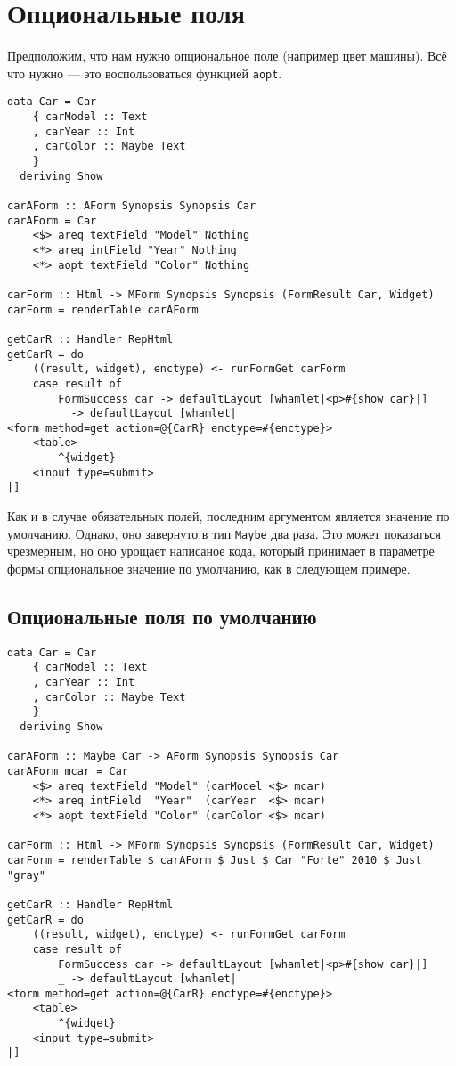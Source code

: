 \section{Опциональные поля}
Предположим, что нам нужно опциональное поле (например цвет машины). Всё что нужно ---
это воспользоваться функцией \lstinline'aopt'.
\begin{remark}
\begin{lstlisting}
data Car = Car
    { carModel :: Text
    , carYear :: Int
    , carColor :: Maybe Text
    }
  deriving Show

carAForm :: AForm Synopsis Synopsis Car
carAForm = Car
    <$> areq textField "Model" Nothing
    <*> areq intField "Year" Nothing
    <*> aopt textField "Color" Nothing

carForm :: Html -> MForm Synopsis Synopsis (FormResult Car, Widget)
carForm = renderTable carAForm

getCarR :: Handler RepHtml
getCarR = do
    ((result, widget), enctype) <- runFormGet carForm
    case result of
        FormSuccess car -> defaultLayout [whamlet|<p>#{show car}|]
        _ -> defaultLayout [whamlet|
<form method=get action=@{CarR} enctype=#{enctype}>
    <table>
        ^{widget}
    <input type=submit>
|]
\end{lstlisting}
\end{remark}
Как и в случае обязательных полей, последним аргументом является значение по умолчанию.
Однако, оно завернуто в тип \lstinline'Maybe' два раза. Это может показаться чрезмерным,
но оно урощает написаное кода, который принимает в параметре формы опциональное значение
по умолчанию, как в следующем примере.

\subsection{Опциональные поля по умолчанию}
\begin{lstlisting}
data Car = Car
    { carModel :: Text
    , carYear :: Int
    , carColor :: Maybe Text
    }
  deriving Show

carAForm :: Maybe Car -> AForm Synopsis Synopsis Car
carAForm mcar = Car
    <$> areq textField "Model" (carModel <$> mcar)
    <*> areq intField  "Year"  (carYear  <$> mcar)
    <*> aopt textField "Color" (carColor <$> mcar)

carForm :: Html -> MForm Synopsis Synopsis (FormResult Car, Widget)
carForm = renderTable $ carAForm $ Just $ Car "Forte" 2010 $ Just "gray"

getCarR :: Handler RepHtml
getCarR = do
    ((result, widget), enctype) <- runFormGet carForm
    case result of
        FormSuccess car -> defaultLayout [whamlet|<p>#{show car}|]
        _ -> defaultLayout [whamlet|
<form method=get action=@{CarR} enctype=#{enctype}>
    <table>
        ^{widget}
    <input type=submit>
|]
\end{lstlisting}

